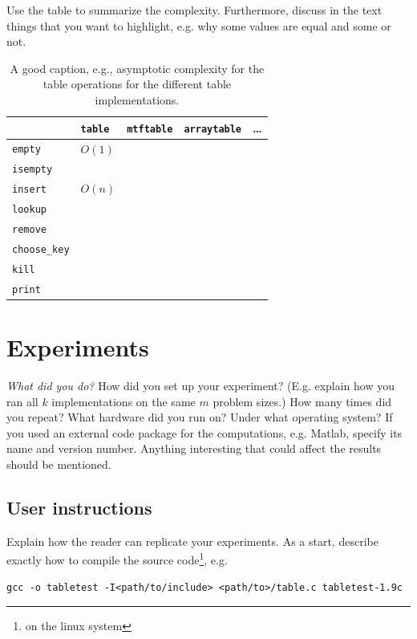\documentclass[10pt, titlepage, oneside, a4paper]{article}
\begin{document}
Use the table to summarize the complexity. Furthermore, discuss in the
text things that you want to highlight, e.g. why some values are equal
and some or not.

\begin{table}[tbp]
\caption{\label{tab:asympt-complexity}A good caption, e.g., asymptotic complexity for the table operations for the different table implementations.}
\centering
\begin{tabular}{l|l|l|l|l}
 & \texttt{table} & \texttt{mtftable} & \texttt{arraytable} & \ldots{}\\
\hline
\texttt{empty} & \(O(1)\) &  &  & \\
\texttt{isempty} &  &  &  & \\
\texttt{insert} & \(O(n)\) &  &  & \\
\texttt{lookup} &  &  &  & \\
\texttt{remove} &  &  &  & \\
\hline
\texttt{choose\_key} &  &  &  & \\
\texttt{kill} &  &  &  & \\
\texttt{print} &  &  &  & \\
\end{tabular}
\end{table}

\section{Experiments}
\label{sec:experiments}
\emph{What did you do?} How did you set up your experiment? (E.g.  explain
how you ran all \(k\) implementations on the same \(m\) problem sizes.)
How many times did you repeat? What hardware did you run on?  Under
what operating system? If you used an external code package for the
computations, e.g. Matlab, specify its name and version number.
Anything interesting that could affect the results should be
mentioned.

\subsection{User instructions}
\label{sec:userguide}
Explain how the reader can replicate your experiments. As a start,
describe exactly how to compile the source code\footnote{on the linux
system}, e.g.

\begin{verbatim}
gcc -o tabletest -I<path/to/include> <path/to>/table.c tabletest-1.9c
\end{verbatim}
\end{document}
